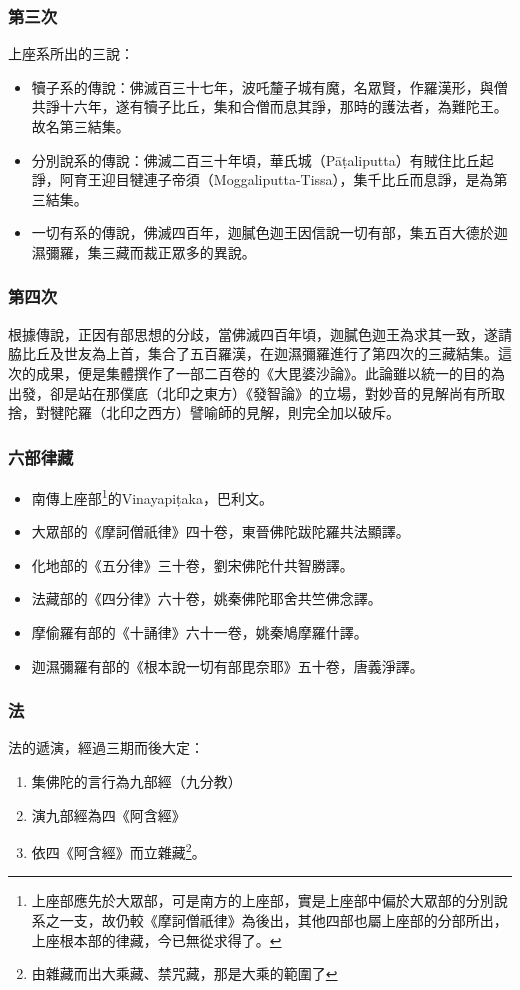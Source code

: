 \subsubsection{第三次}
上座系所出的三說：
\begin{itemize}
  \item 犢子系的傳說：佛滅百三十七年，波吒釐子城有魔，名眾賢，作羅漢形，與僧共諍十六年，遂有犢子比丘，集和合僧而息其諍，那時的護法者，為難陀王。故名第三結集。
  \item 分別說系的傳說：佛滅二百三十年頃，華氏城（Pāṭaliputta）有賊住比丘起諍，阿育王迎目犍連子帝須（Moggaliputta-Tissa），集千比丘而息諍，是為第三結集。
  \item 一切有系的傳說，佛滅四百年，迦膩色迦王因信說一切有部，集五百大德於迦濕彌羅，集三藏而裁正眾多的異說。
\end{itemize}

\subsubsection{第四次}
根據傳說，正因有部思想的分歧，當佛滅四百年頃，迦膩色迦王為求其一致，遂請脇比丘及世友為上首，集合了五百羅漢，在迦濕彌羅進行了第四次的三藏結集。這次的成果，便是集體撰作了一部二百卷的《大毘婆沙論》。此論雖以統一的目的為出發，卻是站在那僕底（北印之東方）《發智論》的立場，對妙音的見解尚有所取捨，對犍陀羅（北印之西方）譬喻師的見解，則完全加以破斥。

\subsubsection{六部律藏}
\begin{itemize}
  \item 南傳上座部\footnote{上座部應先於大眾部，可是南方的上座部，實是上座部中偏於大眾部的分別說系之一支，故仍較《摩訶僧祇律》為後出，其他四部也屬上座部的分部所出，上座根本部的律藏，今已無從求得了。}的Vinayapiṭaka，巴利文。
  \item 大眾部的《摩訶僧祇律》四十卷，東晉佛陀跋陀羅共法顯譯。
  \item 化地部的《五分律》三十卷，劉宋佛陀什共智勝譯。
  \item 法藏部的《四分律》六十卷，姚秦佛陀耶舍共竺佛念譯。
  \item 摩偷羅有部的《十誦律》六十一卷，姚秦鳩摩羅什譯。
  \item 迦濕彌羅有部的《根本說一切有部毘奈耶》五十卷，唐義淨譯。
\end{itemize}

\subsubsection{法}
法的遞演，經過三期而後大定：
\begin{enumerate}
  \item 集佛陀的言行為九部經（九分教）
  \item 演九部經為四《阿含經》
  \item 依四《阿含經》而立雜藏\footnote{由雜藏而出大乘藏、禁咒藏，那是大乘的範圍了}。
\end{enumerate}
